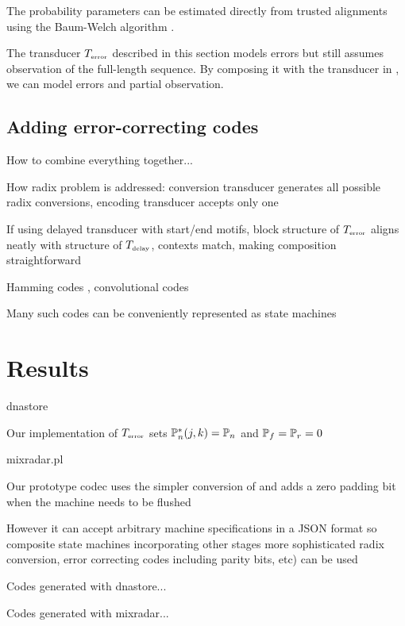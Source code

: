 \documentclass[english]{article}
\begin{document}
The probability parameters can be estimated directly from trusted alignments using the Baum-Welch algorithm \cite{Durbin98}.

The transducer $T_{\mbox{\tiny error}}$
described in this section models errors but still assumes observation of the full-length sequence.
By composing it with the transducer in , we can model errors and partial observation.

\subsection{Adding error-correcting codes}

How to combine everything together...

How radix problem is addressed: conversion transducer generates all possible radix conversions, encoding transducer accepts only one

If using delayed transducer with start/end motifs,
block structure of $T_{\mbox{\tiny error}}$ aligns neatly with structure of $T_{\mbox{\tiny delay}}$,
contexts match,
making composition straightforward

Hamming codes , convolutional codes %

Many such codes can be conveniently represented as state machines

\section{Results}

dnastore

Our implementation of $T_{\mbox{\tiny error}}$
sets $\mathbb{P}_{n}^\ast(j,k)=\mathbb{P}_{n}$
and $\mathbb{P}_{f}=\mathbb{P}_{r}=0$

mixradar.pl

Our prototype codec uses the simpler conversion of
 and adds a zero padding bit when the machine needs to be flushed

However it can accept arbitrary machine specifications in a JSON format
so composite state machines incorporating other stages
more sophisticated radix conversion, error correcting codes including parity bits, etc)
can be used

Codes generated with dnastore...

Codes generated with mixradar...
\end{document}
